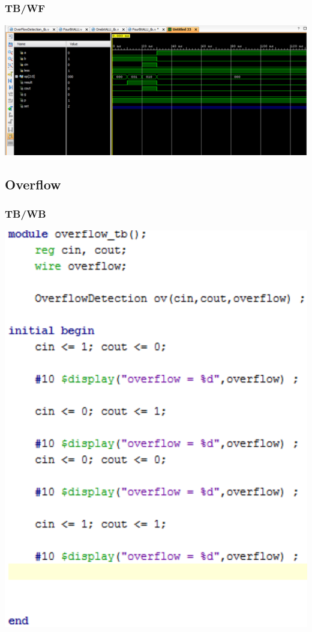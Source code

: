 \documentclass{llncs}
\begin{document}
\subsubsection{ TB/WF}
\begin{addmargin}[-5em]{-6em}
  
\end{addmargin}
\includegraphics[scale=.2]{images/onebitWave.png} %
\subsection{Overflow}
\label{ov:1}
\begin{addmargin}[-5em]{-6em}

\end{addmargin}
\subsubsection{ TB/WB}

\begin{center}
\includegraphics[scale=.2]{images/overflow_tb.png}
\end{center}
\end{document}
